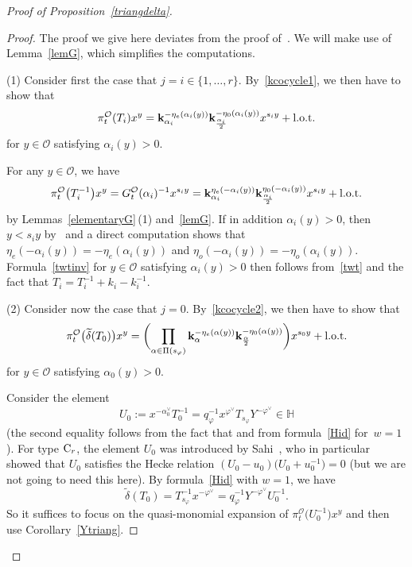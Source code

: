 \documentclass[pdftex]{sigma}
\numberwithin{equation}{section}
\begin{document}
\begin{proof}[Proof of Proposition~\ref{triangdelta}]
\begin{proof}
The proof we give here deviates from the proof of~\cite[Proposition~5.29]{SSV2}. We will make use of Lemma~\ref{lemG}, which simplifies the computations.

(1) Consider first the case that $j=i\in\{1,\dots,r\}$. By~\eqref{kcocycle1}, we then have to show that
 \begin{equation}\label{twtinv}
\pi_{t}^\mathcal{O}(T_i)x^y=\mathbf{k}_{\alpha_i}^{-\eta_e(\alpha_i(y))}\mathbf{k}_{\frac{\alpha_i}{2}}^{-\eta_0(\alpha_i(y))}x^{s_iy}+ {\rm l.o.t.}
\end{equation}
for $y\in\mathcal{O}$ satisfying $\alpha_i(y)>0$.

For any $y\in\mathcal{O}$, we have
\begin{equation}\label{twt}
\pi_{t}^\mathcal{O}\bigl(T_i^{-1}\bigr)x^y=G_{t}^\mathcal{O}(\alpha_i)^{-1}x^{s_iy}=\mathbf{k}_{\alpha_i}^{\eta_e(-\alpha_i(y))}\mathbf{k}_{\frac{\alpha_i}{2}}^{\eta_0(-\alpha_i(y))}x^{s_iy}+ {\rm l.o.t.}
\end{equation}
by Lemmas~\ref{elementaryG}\,(1) and~\ref{lemG}. If in addition $\alpha_i(y)>0$,
then $y<s_iy$ by~\cite[Proposition~5.21]{SSV2} and a direct computation shows that
$\eta_e(-\alpha_i(y))=-\eta_e(\alpha_i(y))$ and $\eta_o(-\alpha_i(y))=-\eta_o(\alpha_i(y))$.
Formula~\eqref{twtinv} for $y\in\mathcal{O}$ satisfying $\alpha_i(y)>0$ then follows from~\eqref{twt} and the fact that
$T_i=T_i^{-1}+k_i-k_i^{-1}$.

(2) Consider now the case that $j=0$. By~\eqref{kcocycle2}, we then have to show that
\begin{equation}\label{twt2inv}
\pi_{t}^\mathcal{O}\bigl(\widetilde{\delta}(T_0)\bigr)x^y=
\biggl(\prod_{\alpha\in\Pi(s_\varphi)}\mathbf{k}_\alpha^{-\eta_e(\alpha(y))}\mathbf{k}_{\frac{\alpha}{2}}^{-\eta_0(\alpha(y))}\biggr)x^{s_0y}+ {\rm l.o.t.}
\end{equation}
for $y\in\mathcal{O}$ satisfying $\alpha_0(y)>0$.

Consider the element
\[
U_0:=x^{-\alpha_0^\vee}T_0^{-1}=q_\varphi^{-1}x^{\varphi^\vee}T_{s_\varphi}Y^{-\varphi^\vee}\in\mathbb{H}
\]
(the second equality follows from the fact that  and from formula~\eqref{Hid} for~${w=1}$). For type ${\rm C}_r$, the element $U_0$ was introduced by Sahi~\cite{Sa}, who in particular showed that
$U_0$ satisfies the Hecke relation $(U_0-u_0)\bigl(U_0+u_0^{-1}\bigr)=0$ (but we are not going to need this here). By formula~\eqref{Hid} with $w=1$, we have
\begin{equation}\label{deltaT0}
\widetilde{\delta}(T_0)=T_{s_\varphi}^{-1}x^{-\varphi^\vee}=q_\varphi^{-1}Y^{-\varphi^\vee}U_0^{-1}.
\end{equation}
So it suffices to focus on the quasi-monomial expansion of $\pi_{t}^\mathcal{O}\bigl(U_0^{-1}\bigr)x^y$ and then use Corollary~\ref{Ytriang}.


\end{proof}
\end{proof}
\end{document}
